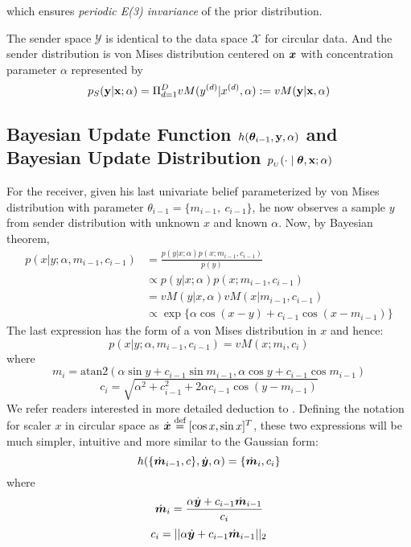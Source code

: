 which ensures \textit{periodic E(3) invariance} of the prior distribution. 

The sender space $\mathcal{Y}$ is identical to the data space $\mathcal{X}$ for circular data. And the sender distribution is von Mises distribution centered on ${\bm{x}}$ with concentration parameter $\alpha$ represented by
\begin{equation}
    p_S (\bold{y} |\bold{x};\alpha) =\Pi_{d=1}^{D}vM(y^{(d)}|x^{(d)},\alpha):=vM(\bold{y}|\bold{x},\alpha)
\end{equation}
\subsection{Bayesian Update Function \texorpdfstring{$h(\boldsymbol{\theta}_{i-1}, \operatorname{\mathbf{y}}, \alpha)$}{} and Bayesian Update Distribution \texorpdfstring{$p_{_U}(\cdot \mid \boldsymbol{\theta}, \operatorname{\mathbf{x}}; \alpha)$}{}}\label{apdx:bayesian_update_function}
For the receiver, given his last univariate belief parameterized by von Mises distribution with parameter $\theta_{i-1}=\{m_{i-1},\ c_{i-1}\}$, he now observes a sample $y$ from sender distribution with unknown $x$ and known $\alpha$. Now, by Bayesian theorem,
\begin{align}
    p(x|y;\alpha,m_{i-1},c_{i-1})&=\frac{p(y|x;\alpha)p(x;m_{i-1},c_{i-1})}{p(y)}\\
    &\propto p(y|x;\alpha)p(x;m_{i-1},c_{i-1})\\
    &= vM(y|x,\alpha)vM(x|m_{i-1},c_{i-1})\\
    &\propto \exp\{{\alpha \cos(x-y)+c_{i-1}\cos(x-m_{i-1})}\} 
\end{align}
The last expression has the form of a von Mises distribution in $x$ and hence:
\begin{equation}
    p(x|y;\alpha,m_{i-1},c_{i-1})=vM(x;m_i,c_i)
\end{equation}
where 
\begin{equation}
m_i=\text{atan2}(\alpha\sin y+c_{i-1}\sin m_{i-1}, {\alpha\cos y+c_{i-1}\cos m_{i-1}})
\end{equation}
\begin{equation}
c_i =\sqrt{\alpha^2+c_{i-1}^2+2\alpha c_{i-1}\cos(y-m_{i-1})}
\end{equation}
We refer readers interested in more detailed deduction to \citet{mardia1976bayesian,guttorp1988finding}. Defining the notation for scaler $x$ in circular space as $\dot{\bm{x}}\stackrel{\text{def}}{=}[\cos x,\sin x]^T$, these two expressions will be much simpler, intuitive and more similar to the Gaussian form:
\begin{equation}
    h(\{\dot{\bm{m}}_{i-1},c\},\dot{\bm{y}},\alpha)=\{\dot{\bm{m}}_i,c_i \}
\end{equation}
where
\begin{equation}\label{eq:update_mi}
\dot{\bm{m}}_{i}=\frac{\alpha \dot{\bm{y}}+c_{i-1}\dot{\bm{m}}_{i-1}}{c_i}
\end{equation}
\begin{equation}\label{eq:update_ci}
c_i=||\alpha\dot{\bm{y}}+c_{i-1}\dot{\bm{m}}_{i-1}||_2
\end{equation}

